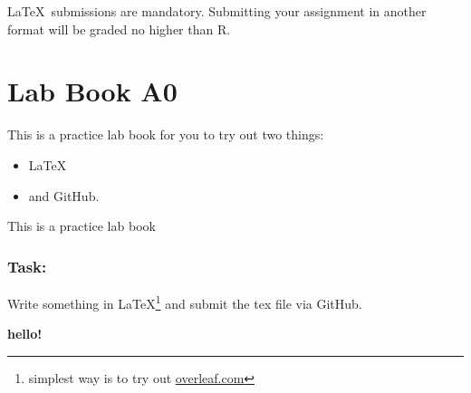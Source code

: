 \documentclass{../labbook}
\begin{document}
\begin{mdframed}[backgroundcolor=blue!20]
\LaTeX ~submissions are mandatory. Submitting your assignment in another format will be graded no higher than R.
\end{mdframed}

\section{Lab Book A0}
This is a practice lab book for you to try out two things:
\begin{itemize}
    \item \LaTeX
    \item and GitHub.
\end{itemize} 


\begin{problem}{1}{0}{This is a practice lab book}

\subsubsection*{Task:}
Write something in LaTeX\footnote{simplest way is to try out \url{overleaf.com}} and submit the tex file via GitHub.
\end{problem}

\begin{solution}

\textbf{hello!}

\end{solution}
\end{document}
